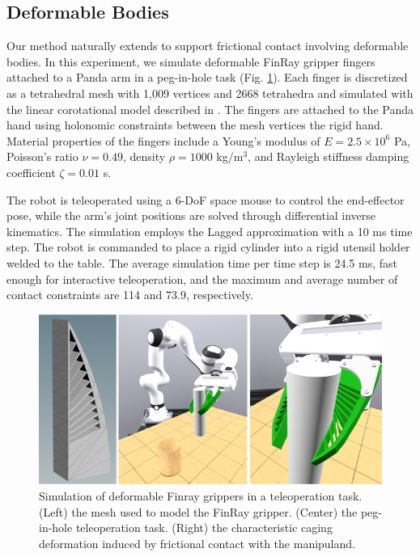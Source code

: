 \subsection{Deformable Bodies}
\label{sec:deformable}

Our method naturally extends to support frictional contact involving deformable
bodies. In this experiment, we simulate deformable FinRay gripper fingers
attached to a Panda arm in a peg-in-hole task (Fig.
\ref{fig:finray}). Each finger is discretized as a
tetrahedral mesh with 1,009 vertices and 2668 tetrahedra and simulated with the
linear corotational model described in \cite{bib:han2023}.
The fingers are attached to the Panda hand using holonomic constraints between
the mesh vertices the rigid hand. Material properties of the fingers include
a Young's modulus of $E=2.5 \times 10^6$ Pa, Poisson's ratio $\nu=0.49$, density
$\rho=1000$ kg/m$^3$, and Rayleigh stiffness damping coefficient $\zeta=0.01$ s.

The robot is teleoperated using a 6-DoF space mouse to control the end-effector
pose, while the arm's joint positions are solved through differential inverse
kinematics. The simulation employs the Lagged approximation with a 10 ms time
step. The robot is commanded to place a rigid cylinder into a rigid utensil
holder welded to the table. The average simulation time per time step is 24.5
ms, fast enough for interactive teleoperation, and the maximum and average
number of contact constraints are 114 and 73.9, respectively. 

\begin{figure}[!h]
    \centering
    \includegraphics[width=\columnwidth]{figures/TestCases/Deformable/combined.png}
    \caption{Simulation of deformable Finray grippers in a teleoperation task. (Left)
    the mesh used to model the FinRay gripper. (Center) the peg-in-hole teleoperation
    task. (Right) the characteristic caging deformation induced by frictional contact
    with the manipuland.}
    \label{fig:finray}
\end{figure}
